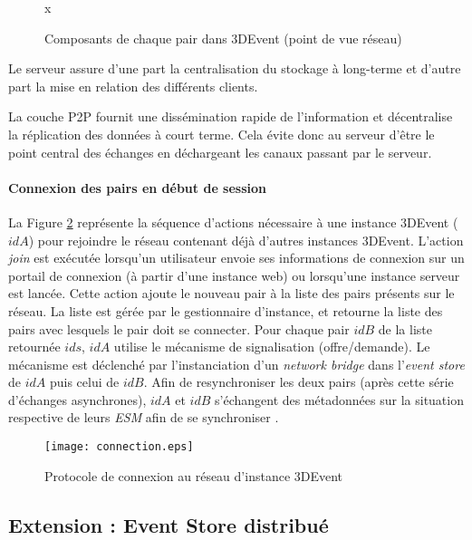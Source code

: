 \begin{figure}[ht]
	\centering
x	\caption{Composants de chaque pair dans 3DEvent (point de vue réseau)}
	\label{fig:middleware}
\end{figure}

Le serveur assure d'une part la centralisation du stockage à long-terme et d'autre 
part la mise en relation des différents clients.

La couche \gls{P2P} fournit une dissémination rapide de l'information et 
décentralise la réplication des données à court terme. Cela évite donc au serveur 
d'être le point central des échanges en déchargeant les canaux passant par le 
serveur.

\paragraph{Connexion des pairs en début de session}

La Figure \ref{fig:connexionpairs} représente la séquence d'actions nécessaire à 
une instance 3DEvent ($idA$) pour rejoindre le réseau contenant déjà d'autres 
instances 3DEvent. L'action \textit{join} est exécutée lorsqu'un utilisateur envoie 
ses informations de connexion sur un portail de connexion (à partir d'une instance 
web) ou lorsqu'une instance serveur est lancée. Cette action ajoute le nouveau 
pair à la liste des pairs présents sur le réseau. La liste est gérée par le gestionnaire 
d'instance, et retourne la liste des pairs avec lesquels le pair doit se connecter. 
Pour chaque pair $idB$ de la liste retournée $ids$, $idA$ utilise le mécanisme de 
signalisation (offre/demande). Le mécanisme est déclenché par l'instanciation d'un 
\textit{network bridge} dans l'\textit{event store}  de $idA$ 
puis celui de $idB$. Afin de resynchroniser les deux pairs (après cette série 
d'échanges asynchrones), $idA$ et $idB$ s'échangent des métadonnées sur la 
situation respective de leurs \textit{ESM}  afin de se synchroniser 
.

\begin{figure}[t]
	\noindent
	\centering
	\texttt{[image: connection.eps]}
	\caption{Protocole de connexion au réseau d'instance 3DEvent}
	\label{fig:connexionpairs}
\end{figure}

\subsection{Extension : Event Store distribué}

